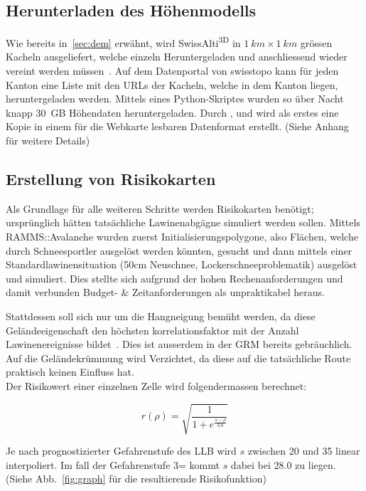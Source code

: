 \subsection{Herunterladen des Höhenmodells}

Wie bereits in\ \ref{sec:dem} erwähnt, wird SwissAlti\textsuperscript{3D} in $\qty{1}{km} \times \qty{1}{km}$ grössen Kacheln ausgeliefert, welche einzeln Heruntergeladen und anschliessend wieder vereint werden müssen~\cite{alti3dprod}. Auf dem Datenportal von swisstopo kann für jeden Kanton eine Liste mit den URLs der Kacheln, welche in dem Kanton liegen, heruntergeladen werden. Mittels eines Python-Skriptes wurden so über Nacht knapp \qty{30}{GB} Höhendaten heruntergeladen. Durch ,  und  wird als erstes eine Kopie in einem für die Webkarte lesbaren Datenformat erstellt. (Siehe Anhang für weitere Details)

\subsection{Erstellung von Risikokarten}

Als Grundlage für alle weiteren Schritte werden Risikokarten benötigt; ursprünglich hätten tatsächliche Lawinenabgägne simuliert werden sollen. Mittels RAMMS::Avalanche wurden zuerst Initialisierungspolygone, also Flächen, welche durch Schneesportler ausgelöst werden könnten, gesucht und dann mittels einer Standardlawinensituation (50cm Neuschnee, Lockerschneeproblematik) ausgelöst und simuliert. Dies stellte sich aufgrund der hohen Rechenanforderungen und damit verbunden Budget- \& Zeitanforderungen als unpraktikabel heraus.

Stattdessen soll sich nur um die Hangneigung bemüht werden, da diese Geländeeigenschaft den höchsten korrelationsfaktor mit der Anzahl Lawinenereignisse bildet~\cite{arpddatasetdocs}. Dies ist ausserdem in der GRM bereits gebräuchlich. Auf die Geländekrümmung wird Verzichtet, da diese auf die tatsächliche Route praktisch keinen Einfluss hat.\\
Der Risikowert einer einzelnen Zelle wird folgendermassen berechnet:

\[
r(\rho) = \sqrt{\frac{1}{1 + e^{\frac{s-\rho}{3.0}}}}
\]

Je nach prognostizierter Gefahrenstufe des LLB wird $s$ zwischen 20 und 35 linear interpoliert. Im fall der Gefahrenstufe 3= kommt $s$ dabei bei 28.0 zu liegen. (Siehe Abb.~\ref{fig:graph} für die resultierende Risikofunktion)

